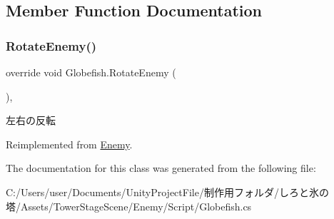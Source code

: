 \subsection{Member Function Documentation}
\mbox{\label{class_globefish_a31c4458c5be4f3739e1ceedd69656185}} 
\subsubsection{\texorpdfstring{Rotate\+Enemy()}{RotateEnemy()}}
{\footnotesize\ttfamily override void Globefish.\+Rotate\+Enemy (\begin{DoxyParamCaption}{ }\end{DoxyParamCaption})\hspace{0.3cm}{\ttfamily [inline]}, {\ttfamily [virtual]}}



左右の反転 



Reimplemented from \hyperlink{class_enemy_a2a0e665070fd362bd3ab2f2962ebff93}{Enemy}.



The documentation for this class was generated from the following file\+:\begin{DoxyCompactItemize}
\item 
C\+:/\+Users/user/\+Documents/\+Unity\+Project\+File/制作用フォルダ/しろと氷の塔/\+Assets/\+Tower\+Stage\+Scene/\+Enemy/\+Script/Globefish.\+cs\end{DoxyCompactItemize}
